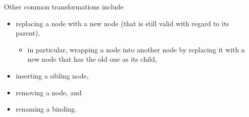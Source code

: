 Other common transformations include
\autocite{BabelPluginHandbook}
\begin{itemize}
  \item replacing a node with a new node
    (that is still valid with regard to its parent),
    \begin{itemize}
      \item in particular,
        wrapping a node into another node
        by replacing it with a new node
        that has the old one as its child,
    \end{itemize}
  \item inserting a sibling node,
  \item removing a node, and
  \item renaming a binding.
\end{itemize}
